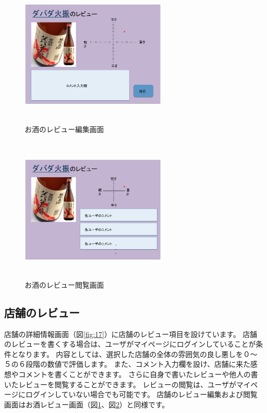 \documentclass[a4j,titlepage]{jarticle}
\begin{document}
\begin {figure}[htbp]
    \begin{center}
    \includegraphics [height=7cm, width=7cm]{extrnal_design_document_image/15.eps}
    \caption {お酒のレビュー編集画面}
    \label {fig:15}
    \end{center}
\end {figure}

\begin {figure}[htbp]
    \begin{center}
    \includegraphics [height=7cm, width=7cm]{extrnal_design_document_image/16.eps}
    \caption {お酒のレビュー閲覧画面}
    \label {fig:16}
    \end{center}
\end {figure}


\subsection{店舗のレビュー}
店舗の詳細情報画面（図\ref{fig:17}）に店舗のレビュー項目を設けています。
店舗のレビューを書くする場合は、ユーザがマイページにログインしていることが条件となります。
内容としては、選択した店舗の全体の雰囲気の良し悪しを０〜５の６段階の数値で評価します。
また、コメント入力欄を設け、店舗に来た感想やコメントを書くことができます。
さらに自身で書いたレビューや他人の書いたレビューを閲覧することができます。
レビューの閲覧は、ユーザがマイページにログインしていない場合でも可能です。
店舗のレビュー編集および閲覧画面はお酒レビュー画面（図\ref{fig:15}、図\ref{fig:16}）と同様です。
\end{document}
